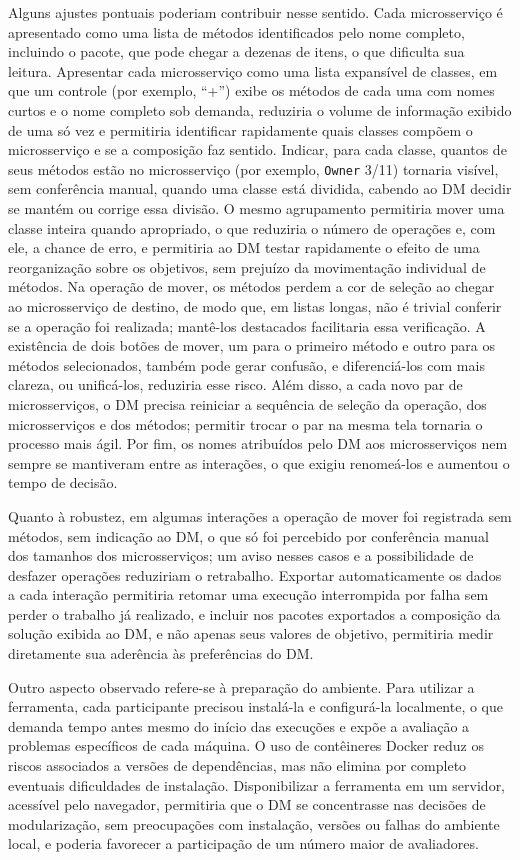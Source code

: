 \documentclass[conference]{IEEEtran}
\begin{document}
Alguns ajustes pontuais poderiam contribuir nesse sentido. Cada microsserviço é apresentado como uma lista de métodos identificados pelo nome completo, incluindo o pacote, que pode chegar a dezenas de itens, o que dificulta sua leitura. Apresentar cada microsserviço como uma lista expansível de classes, em que um controle (por exemplo, ``+'') exibe os métodos de cada uma com nomes curtos e o nome completo sob demanda, reduziria o volume de informação exibido de uma só vez e permitiria identificar rapidamente quais classes compõem o microsserviço e se a composição faz sentido. Indicar, para cada classe, quantos de seus métodos estão no microsserviço (por exemplo, \texttt{Owner} 3/11) tornaria visível, sem conferência manual, quando uma classe está dividida, cabendo ao DM decidir se mantém ou corrige essa divisão. O mesmo agrupamento permitiria mover uma classe inteira quando apropriado, o que reduziria o número de operações e, com ele, a chance de erro, e permitiria ao DM testar rapidamente o efeito de uma reorganização sobre os objetivos, sem prejuízo da movimentação individual de métodos. Na operação de mover, os métodos perdem a cor de seleção ao chegar ao microsserviço de destino, de modo que, em listas longas, não é trivial conferir se a operação foi realizada; mantê-los destacados facilitaria essa verificação. A existência de dois botões de mover, um para o primeiro método e outro para os métodos selecionados, também pode gerar confusão, e diferenciá-los com mais clareza, ou unificá-los, reduziria esse risco. Além disso, a cada novo par de microsserviços, o DM precisa reiniciar a sequência de seleção da operação, dos microsserviços e dos métodos; permitir trocar o par na mesma tela tornaria o processo mais ágil. Por fim, os nomes atribuídos pelo DM aos microsserviços nem sempre se mantiveram entre as interações, o que exigiu renomeá-los e aumentou o tempo de decisão.

Quanto à robustez, em algumas interações a operação de mover foi registrada sem métodos, sem indicação ao DM, o que só foi percebido por conferência manual dos tamanhos dos microsserviços; um aviso nesses casos e a possibilidade de desfazer operações reduziriam o retrabalho. Exportar automaticamente os dados a cada interação permitiria retomar uma execução interrompida por falha sem perder o trabalho já realizado, e incluir nos pacotes exportados a composição da solução exibida ao DM, e não apenas seus valores de objetivo, permitiria medir diretamente sua aderência às preferências do DM.

Outro aspecto observado refere-se à preparação do ambiente. Para utilizar a ferramenta, cada participante precisou instalá-la e configurá-la localmente, o que demanda tempo antes mesmo do início das execuções e expõe a avaliação a problemas específicos de cada máquina. O uso de contêineres Docker reduz os riscos associados a versões de dependências, mas não elimina por completo eventuais dificuldades de instalação. Disponibilizar a ferramenta em um servidor, acessível pelo navegador, permitiria que o DM se concentrasse nas decisões de modularização, sem preocupações com instalação, versões ou falhas do ambiente local, e poderia favorecer a participação de um número maior de avaliadores.
\end{document}
